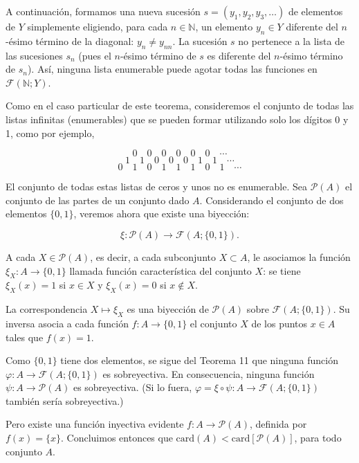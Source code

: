 A continuación, formamos una nueva sucesión \( s = (y_1, y_2, y_3, \ldots) \) de elementos de \( Y \) simplemente eligiendo, para cada \( n \in \mathbb{N} \), un elemento \( y_n \in Y \) diferente del \( n \)-ésimo término de la diagonal: \( y_n \neq y_{nn} \). La sucesión \( s \) no pertenece a la lista de las sucesiones \( s_n \) (pues el \( n \)-ésimo término de \( s \) es diferente del \( n \)-ésimo término de \( s_n \)). Así, ninguna lista enumerable puede agotar todas las funciones en \( \mathcal{F}(\mathbb{N}; Y) \).

Como en el caso particular de este teorema, consideremos el conjunto de todas las listas infinitas (enumerables) que se pueden formar utilizando solo los dígitos 0 y 1, como por ejemplo,

\[
0 \quad 0 \quad 0 \quad 0 \quad 0 \quad 0 \quad \cdots
\]
\[
1 \quad 1 \quad 0 \quad 0 \quad 0 \quad 1 \quad 1 \quad \cdots
\]
\[
0 \quad 1 \quad 0 \quad 1 \quad 1 \quad 1 \quad 0 \quad 1 \quad \cdots
\]

El conjunto de todas estas listas de ceros y unos no es enumerable. Sea \( \mathcal{P}(A) \) el conjunto de las partes de un conjunto dado \( A \). Considerando el conjunto de dos elementos \( \{0, 1\} \), veremos ahora que existe una biyección:

\[
\xi : \mathcal{P}(A) \to \mathcal{F}(A; \{0, 1\}).
\]

A cada \( X \in \mathcal{P}(A) \), es decir, a cada subconjunto \( X \subset A \), le asociamos la función \( \xi_X : A \to \{0, 1\} \) llamada función característica del conjunto \( X \): se tiene \( \xi_X(x) = 1 \) si \( x \in X \) y \( \xi_X(x) = 0 \) si \( x \notin X \).

La correspondencia \( X \mapsto \xi_X \) es una biyección de \( \mathcal{P}(A) \) sobre \( \mathcal{F}(A; \{0, 1\}) \). Su inversa asocia a cada función \( f : A \to \{0, 1\} \) el conjunto \( X \) de los puntos \( x \in A \) tales que \( f(x) = 1 \).

Como \( \{0, 1\} \) tiene dos elementos, se sigue del Teorema 11 que ninguna función \( \varphi : A \to \mathcal{F}(A; \{0, 1\}) \) es sobreyectiva. En consecuencia, ninguna función \( \psi : A \to \mathcal{P}(A) \) es sobreyectiva. (Si lo fuera, \( \varphi = \xi \circ \psi : A \to \mathcal{F}(A; \{0, 1\}) \) también sería sobreyectiva.)

Pero existe una función inyectiva evidente \( f : A \to \mathcal{P}(A) \), definida por \( f(x) = \{x\} \). Concluimos entonces que \( \text{card}(A) < \text{card}[\mathcal{P}(A)] \), para todo conjunto \( A \).


